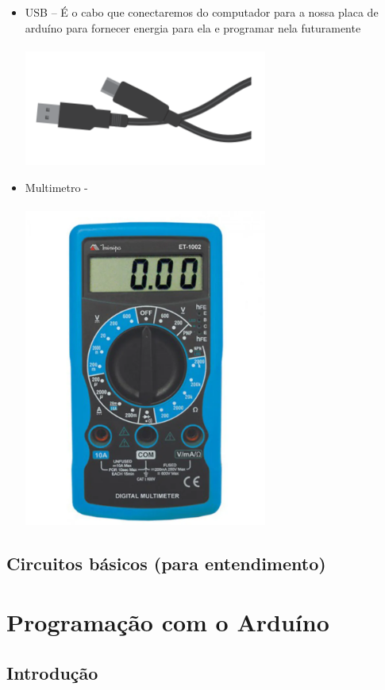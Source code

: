 \documentclass{report}
\begin{document}
\begin{itemize}
		\item USB – É o cabo que conectaremos do computador para a nossa placa de arduíno para fornecer energia para ela e programar nela futuramente  \\ \\
		\includegraphics[width=8cm]{imagens/usb.png}
		
		\item Multimetro - \\ \\
		\includegraphics[width=8cm]{imagens/multimetro.png}
	\end{itemize}
	
	\section{Circuitos básicos (para entendimento)}
	
	\chapter{Programação com o Arduíno}
	\section{Introdução}
	
\end{document}
